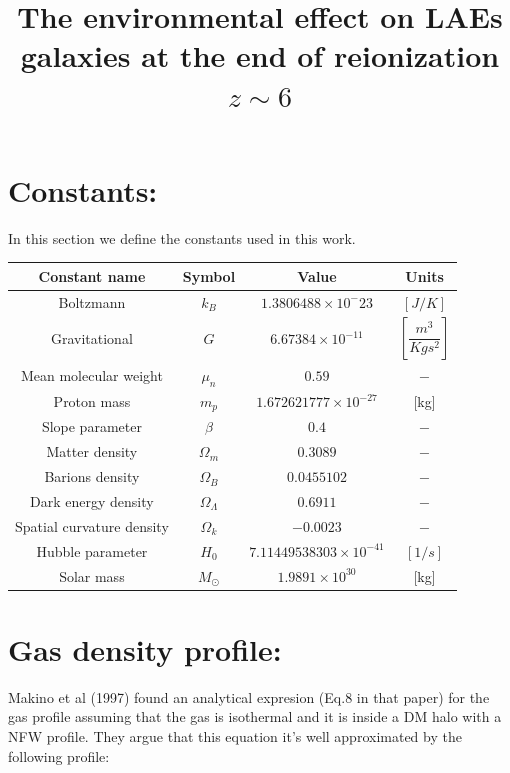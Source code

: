 \documentclass[12pt]{article}
\title{\begin{LARGE}
{The environmental effect on LAEs galaxies at the end of reionization $z\sim 6$}
\end{LARGE}}
\begin{document}
\maketitle

\section{Constants:}

In this section we define the constants used in this work.

\begin{table}[H]
\begin{center}
\begin{tabular}{c c c c}
\hline
Constant name & Symbol & Value & Units \\
\hline
\hline
Boltzmann  & $k_B$ & $1.3806488\times 10^-{23}$ & $[J/K]$ \\ 
Gravitational & $G$ & $6.67384\times 10^{-11}$ & $[\dfrac{m^3}{Kgs^2}]$\\
Mean molecular weight &$\mu_n$ & $0.59$ & $-$ \\
Proton mass & $m_p$ & $1.672621777\times 10^{-27}$ & [kg] \\
Slope parameter & $\beta$ & $0.4$ & $-$ \\
Matter density & $\Omega_m$ & $0.3089$ & $-$ \\ 
Barions density & $\Omega_B$ & $ 0.0455102$ & $-$ \\
Dark energy density & $\Omega_{\Lambda}$ & $0.6911$ & $-$ \\
Spatial curvature density& $\Omega_{k} $ & $-0.0023$ & $-$ \\
Hubble parameter & $H_0$ & $7.11449538303\times 10^{-41}$& $[1/s]$ \\
Solar mass &  $M_{\odot} $ & $1.9891\times 10^{30}$  & [kg] \\ 
\hline
\end{tabular}
\end{center}
\end{table}

\section{Gas density profile:}

Makino et al (1997) found an analytical expresion (Eq.8 in that paper) for the gas profile assuming that the gas
is isothermal and it is inside a DM halo with a NFW profile. They argue that this equation it's well approximated by 
the following profile:
\end{document}
